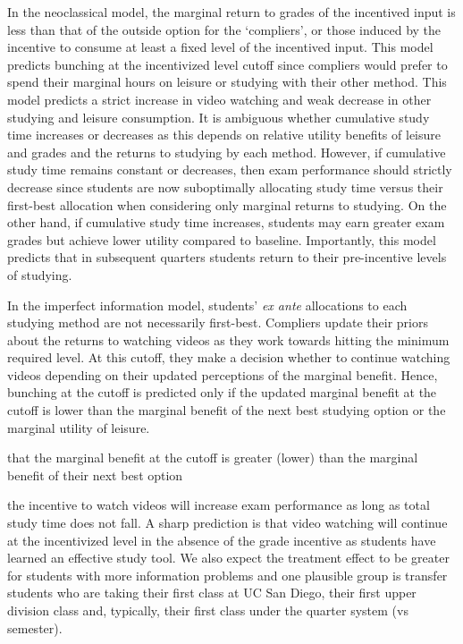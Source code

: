 \documentclass[12pt]{article}
\begin{document}
In the neoclassical model, the marginal return to grades of the incentived input is less than that of the outside option for the `compliers', or those induced by the incentive to consume at least a fixed level of the incentived input. This model predicts bunching at the incentivized level cutoff since compliers would prefer to spend their marginal hours on leisure or studying with their other method. This model predicts a strict increase in video watching and weak decrease in other studying and leisure consumption. It is ambiguous whether cumulative study time increases or decreases as this depends on relative utility benefits of leisure and grades and the returns to studying by each method. However, if cumulative study time remains constant or decreases, then exam performance should strictly decrease since students are now suboptimally allocating study time versus their first-best allocation when considering only marginal returns to studying. On the other hand, if cumulative study time increases, students may earn greater exam grades but achieve lower utility compared to baseline. Importantly, this model predicts that in subsequent quarters students return to their pre-incentive levels of studying.

In the imperfect information model, students' \textit{ex ante} allocations to each studying method are not necessarily first-best. Compliers update their priors about the returns to watching videos as they work towards hitting the minimum required level. At this cutoff, they make a decision whether to continue watching videos depending on their updated perceptions of the marginal benefit. Hence, bunching at the cutoff is predicted only if the updated marginal benefit at the cutoff is lower than the marginal benefit of the next best studying option or the marginal utility of leisure.

 that the marginal benefit at the cutoff is greater (lower) than the marginal benefit of their next best option

the incentive to watch videos will increase exam performance as long as total study time does not fall. A sharp prediction is that video watching will continue at the incentivized level in the absence of the grade incentive as students have learned an effective study tool. We also expect the treatment effect to be greater for students with more information problems and one plausible group is transfer students who are taking their first class at UC San Diego, their first upper division class and, typically, their first class under the quarter system (vs semester).
\end{document}
